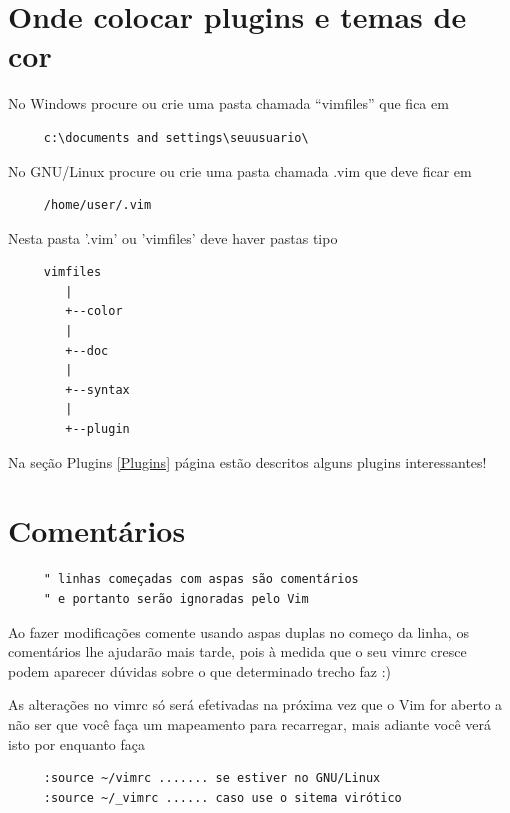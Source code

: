 \documentclass[10pt,a4paper,openany]{book}
\begin{document}
\section{Onde colocar plugins e temas de cor}
\label{Onde colocar plugins e temas de cor}

No Windows procure ou crie uma pasta chamada ``vimfiles'' que fica em

\begin{verbatim}
     c:\documents and settings\seuusuario\
\end{verbatim}

No GNU/Linux procure ou crie uma pasta chamada .vim que deve ficar em

\begin{verbatim}
     /home/user/.vim
\end{verbatim}

Nesta pasta '.vim' ou 'vimfiles' deve haver pastas tipo

\begin{verbatim}
     vimfiles
        |
        +--color
        |
        +--doc
        |
        +--syntax
        |
        +--plugin
\end{verbatim}

Na seção Plugins \ref{Plugins} página \pageref{Plugins}
estão descritos alguns plugins interessantes!

\section{Comentários }
\label{Comentários }

\begin{verbatim}
     " linhas começadas com aspas são comentários
     " e portanto serão ignoradas pelo Vim
\end{verbatim}

Ao fazer modificações comente usando aspas duplas no começo da linha,
os comentários lhe ajudarão mais tarde, pois à medida que o seu vimrc
cresce podem aparecer dúvidas sobre o que determinado trecho faz :)


As alterações no vimrc só será efetivadas na próxima vez que o Vim for aberto
a não ser que você faça um mapeamento para recarregar, mais adiante você verá isto
por enquanto faça

\begin{verbatim}
     :source ~/vimrc ....... se estiver no GNU/Linux
     :source ~/_vimrc ...... caso use o sitema virótico
\end{verbatim}
\end{document}
